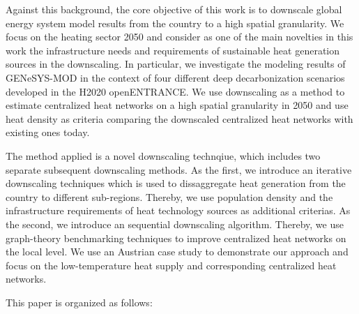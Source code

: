 Against this background, the core objective of this work is to downscale global energy system model results from the country to a high spatial granularity. We focus on the heating sector 2050 and consider as one of the main novelties in this work the infrastructure needs and requirements of sustainable heat generation sources in the downscaling. In particular, we investigate the modeling results of GENeSYS-MOD in the context of four different deep decarbonization scenarios developed in the H2020 openENTRANCE. We use downscaling as a method to estimate centralized heat networks on a high spatial granularity in 2050 and use heat density as criteria comparing the downscaled centralized heat networks with existing ones today.\newline

The method applied is a novel downscaling technqiue, which includes two separate subsequent downscaling methods. As the first, we introduce an iterative downscaling techniques which is used to dissaggregate heat generation from the country to different sub-regions. Thereby, we use population density and the infrastructure requirements of heat technology sources as additional criterias. As the second, we introduce an sequential downscaling algorithm. Thereby, we use graph-theory benchmarking techniques to improve centralized heat networks on the local level. We use an Austrian case study to demonstrate our approach and focus on the low-temperature heat supply and corresponding centralized heat networks.\newline

This paper is organized as follows:























